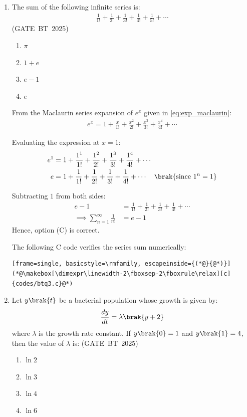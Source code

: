 \begin{enumerate}[label=\thesubsection.\arabic*, ref=\thesubsection.\theenumi]

\item The sum of the following infinite series is:
\begin{align}
\frac{1}{1!} + \frac{1}{2!} + \frac{1}{3!} + \frac{1}{4!} + \frac{1}{5!} + \cdots
\end{align}
\hfill (GATE~BT~2025)
\begin{enumerate}
    \item $\pi$
    \item $1+e$
    \item $e-1$
    \item $e$
\end{enumerate}

\solution
From the Maclaurin series expansion of $e^x$ given in \eqref{eq:exp_maclaurin}:
\begin{align}
e^x = 1 + \frac{x}{1!} + \frac{x^2}{2!} + \frac{x^3}{3!} + \frac{x^4}{4!} + \cdots
\end{align}

Evaluating the expression at $x = 1$:
\begin{align}
e^1 &= 1 + \frac{1^1}{1!} + \frac{1^2}{2!} + \frac{1^3}{3!} + \frac{1^4}{4!} + \cdots \\
e &= 1 + \frac{1}{1!} + \frac{1}{2!} + \frac{1}{3!} + \frac{1}{4!} + \cdots \quad \brak{\text{since } 1^n = 1}
\end{align}

Subtracting $1$ from both sides:
\begin{align}
e - 1 &= \frac{1}{1!} + \frac{1}{2!} + \frac{1}{3!} + \frac{1}{4!} + \cdots \\
\implies \sum_{n=1}^{\infty} \frac{1}{n!} &= e - 1
\end{align}
Hence, option (C) is correct.

The following C code verifies the series sum numerically:


\begin{lstlisting}[frame=single, basicstyle=\rmfamily, escapeinside={(*@}{@*)}]
(*@\makebox[\dimexpr\linewidth-2\fboxsep-2\fboxrule\relax][c]{codes/btq3.c}@*)
\end{lstlisting}

\item Let $y\brak{t}$ be a bacterial population whose growth is given by:
\begin{align}
\frac{dy}{dt} = \lambda\brak{y + 2}
\end{align}
where $\lambda$ is the growth rate constant. If $y\brak{0} = 1$ and $y\brak{1} = 4$, then the value of $\lambda$ is:
\hfill (GATE~BT~2025)
\begin{enumerate}
    \item $\ln 2$
    \item $\ln 3$
    \item $\ln 4$
    \item $\ln 6$
\end{enumerate}


\end{enumerate}
